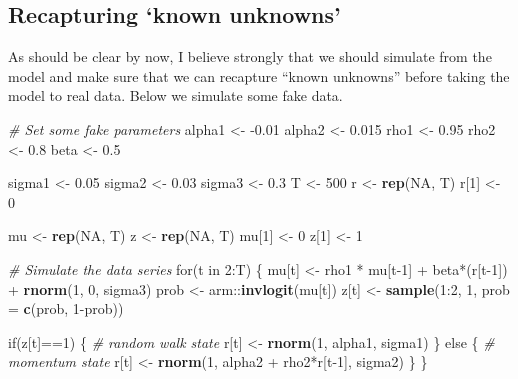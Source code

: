 \documentclass[]{book}
\newenvironment{Shaded}{\begin{snugshade}}{\end{snugshade}}
\newcommand{\KeywordTok}[1]{\textcolor[rgb]{0.13,0.29,0.53}{\textbf{{#1}}}}
\newcommand{\DataTypeTok}[1]{\textcolor[rgb]{0.13,0.29,0.53}{{#1}}}
\newcommand{\DecValTok}[1]{\textcolor[rgb]{0.00,0.00,0.81}{{#1}}}
\newcommand{\FloatTok}[1]{\textcolor[rgb]{0.00,0.00,0.81}{{#1}}}
\newcommand{\StringTok}[1]{\textcolor[rgb]{0.31,0.60,0.02}{{#1}}}
\newcommand{\CommentTok}[1]{\textcolor[rgb]{0.56,0.35,0.01}{\textit{{#1}}}}
\newcommand{\OtherTok}[1]{\textcolor[rgb]{0.56,0.35,0.01}{{#1}}}
\newcommand{\NormalTok}[1]{{#1}}
\begin{document}
\subsection{\texorpdfstring{Recapturing `known
unknowns'}{Recapturing known unknowns}}\label{recapturing-known-unknowns}

As should be clear by now, I believe strongly that we should simulate
from the model and make sure that we can recapture ``known unknowns''
before taking the model to real data. Below we simulate some fake data.

\begin{Shaded}
\begin{Highlighting}[]
\CommentTok{# Set some fake parameters}
\NormalTok{alpha1 <-}\StringTok{ }\NormalTok{-}\FloatTok{0.01}
\NormalTok{alpha2 <-}\StringTok{ }\FloatTok{0.015}
\NormalTok{rho1 <-}\StringTok{ }\FloatTok{0.95}
\NormalTok{rho2 <-}\StringTok{ }\FloatTok{0.8}
\NormalTok{beta <-}\StringTok{ }\FloatTok{0.5}

\NormalTok{sigma1 <-}\StringTok{ }\FloatTok{0.05}
\NormalTok{sigma2 <-}\StringTok{ }\FloatTok{0.03}
\NormalTok{sigma3 <-}\StringTok{ }\FloatTok{0.3}
\NormalTok{T <-}\StringTok{ }\DecValTok{500}
\NormalTok{r <-}\StringTok{ }\KeywordTok{rep}\NormalTok{(}\OtherTok{NA}\NormalTok{, T)}
\NormalTok{r[}\DecValTok{1}\NormalTok{] <-}\StringTok{ }\DecValTok{0}

\NormalTok{mu <-}\StringTok{ }\KeywordTok{rep}\NormalTok{(}\OtherTok{NA}\NormalTok{, T)}
\NormalTok{z <-}\StringTok{ }\KeywordTok{rep}\NormalTok{(}\OtherTok{NA}\NormalTok{, T)}
\NormalTok{mu[}\DecValTok{1}\NormalTok{] <-}\StringTok{ }\DecValTok{0}
\NormalTok{z[}\DecValTok{1}\NormalTok{] <-}\StringTok{ }\DecValTok{1}


\CommentTok{# Simulate the data series}
\NormalTok{for(t in }\DecValTok{2}\NormalTok{:T) \{}
  \NormalTok{mu[t]  <-}\StringTok{ }\NormalTok{rho1 *}\StringTok{ }\NormalTok{mu[t}\DecValTok{-1}\NormalTok{] +}\StringTok{ }\NormalTok{beta*(r[t}\DecValTok{-1}\NormalTok{]) +}\StringTok{ }\KeywordTok{rnorm}\NormalTok{(}\DecValTok{1}\NormalTok{, }\DecValTok{0}\NormalTok{, sigma3)}
  \NormalTok{prob <-}\StringTok{ }\NormalTok{arm::}\KeywordTok{invlogit}\NormalTok{(mu[t])}
  \NormalTok{z[t] <-}\StringTok{ }\KeywordTok{sample}\NormalTok{(}\DecValTok{1}\NormalTok{:}\DecValTok{2}\NormalTok{, }\DecValTok{1}\NormalTok{, }\DataTypeTok{prob =} \KeywordTok{c}\NormalTok{(prob, }\DecValTok{1}\NormalTok{-prob))}
  
  \NormalTok{if(z[t]==}\DecValTok{1}\NormalTok{) \{}
    \CommentTok{# random walk state}
    \NormalTok{r[t] <-}\StringTok{ }\KeywordTok{rnorm}\NormalTok{(}\DecValTok{1}\NormalTok{, alpha1, sigma1)}
  \NormalTok{\} else \{}
    \CommentTok{# momentum state}
    \NormalTok{r[t] <-}\StringTok{ }\KeywordTok{rnorm}\NormalTok{(}\DecValTok{1}\NormalTok{, alpha2 +}\StringTok{ }\NormalTok{rho2*r[t}\DecValTok{-1}\NormalTok{], sigma2)}
  \NormalTok{\}}
\NormalTok{\}}
\end{Highlighting}
\end{Shaded}
\end{document}
